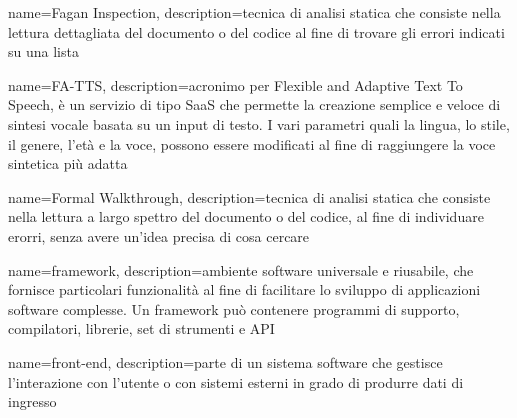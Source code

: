 {
	name=Fagan Inspection,
	description={tecnica di analisi statica che consiste nella lettura dettagliata del documento o del codice al fine di trovare gli errori indicati su una lista}
}

{
	name=FA-TTS,
	description={acronimo per Flexible and Adaptive Text To Speech, è un servizio di tipo SaaS che permette la creazione semplice e veloce di sintesi vocale basata su un input di testo. I vari parametri quali la lingua, lo stile, il genere, l'età e la voce, possono essere modificati al fine di raggiungere la voce sintetica più adatta}
}

{
	name=Formal Walkthrough,
	description={tecnica di analisi statica che consiste nella lettura a largo spettro del documento o del codice, al fine di individuare erorri, senza avere un'idea precisa di cosa cercare}
}

{
	name=framework,
	description={ambiente software universale e riusabile, che fornisce particolari funzionalità al fine di facilitare lo sviluppo di applicazioni software complesse. Un framework può contenere programmi di supporto, compilatori, librerie, set di strumenti e API}
}

{
	name=front-end,
	description={parte di un sistema software che gestisce l'interazione con l'utente o con sistemi esterni in grado di produrre dati di ingresso}
}